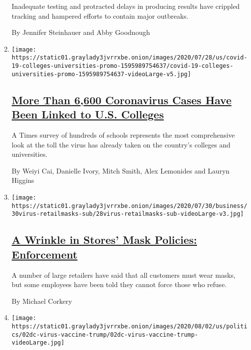 \begin{enumerate}
  Inadequate testing and protracted delays in producing results have
  crippled tracking and hampered efforts to contain major outbreaks.

  By Jennifer Steinhauer and Abby Goodnough
\item
  \texttt{[image: https://static01.graylady3jvrrxbe.onion/images/2020/07/28/us/covid-19-colleges-universities-promo-1595989754637/covid-19-colleges-universities-promo-1595989754637-videoLarge-v5.jpg]}

  \hypertarget{more-than-6600-coronavirus-cases-have-been-linked-to-us-colleges}{%
  \subsection{\texorpdfstring{\href{/interactive/2020/07/28/us/covid-19-colleges-universities.html}{More
  Than 6,600 Coronavirus Cases Have Been Linked to U.S.
  Colleges}}{More Than 6,600 Coronavirus Cases Have Been Linked to U.S. Colleges}}\label{more-than-6600-coronavirus-cases-have-been-linked-to-us-colleges}}

  A Times survey of hundreds of schools represents the most
  comprehensive look at the toll the virus has already taken on the
  country's colleges and universities.

  By Weiyi Cai, Danielle Ivory, Mitch Smith, Alex Lemonides and Lauryn
  Higgins
\item
  \texttt{[image: https://static01.graylady3jvrrxbe.onion/images/2020/07/30/business/30virus-retailmasks-sub/28virus-retailmasks-sub-videoLarge-v3.jpg]}

  \hypertarget{a-wrinkle-in-stores-mask-policies-enforcement}{%
  \subsection{\texorpdfstring{\href{/2020/07/29/business/coronavirus-masks-stores-walmart.html}{A
  Wrinkle in Stores' Mask Policies:
  Enforcement}}{A Wrinkle in Stores' Mask Policies: Enforcement}}\label{a-wrinkle-in-stores-mask-policies-enforcement}}

  A number of large retailers have said that all customers must wear
  masks, but some employees have been told they cannot force those who
  refuse.

  By Michael Corkery
\item
  \texttt{[image: https://static01.graylady3jvrrxbe.onion/images/2020/08/02/us/politics/02dc-virus-vaccine-trump/02dc-virus-vaccine-trump-videoLarge.jpg]}


\end{enumerate}
